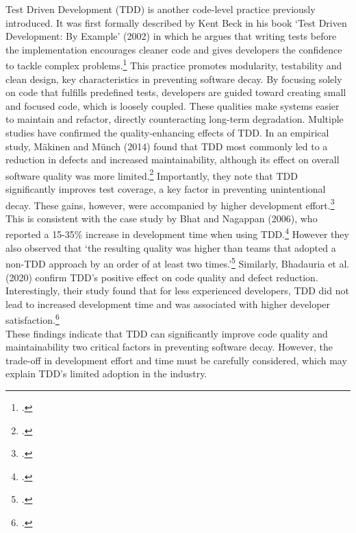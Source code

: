 Test Driven Development (TDD) is another code-level practice previously introduced. It was first formally described by Kent Beck in his book
`Test Driven Development: By Example' (2002) in which he argues that writing tests before the implementation
encourages cleaner code and gives developers the confidence to tackle complex problems.\footcite[pp. 8-9]{beckTestdrivenDevelopmentExample2002}
This practice promotes modularity, testability and clean design, key characteristics in preventing software decay. By focusing solely on code
that fulfills predefined tests, developers are guided toward creating small and focused code, which is loosely coupled. These qualities make systems
easier to maintain and refactor, directly counteracting long-term degradation.
Multiple studies have confirmed the quality-enhancing effects of \ac{TDD}.
In an empirical study, Mäkinen and Münch (2014) found that  TDD most commonly led to a reduction in defects and increased maintainability, 
although its effect on overall software quality was more limited.\footcite[13]{inproceedings}
Importantly, they note that TDD significantly improves test coverage, a key factor in preventing unintentional decay.
These gains, however, were accompanied by higher development effort.\footcite[13]{inproceedings}\\
This is consistent with the case study by Bhat and Nagappan (2006), who reported a 15-35\% increase in development time when using \ac{TDD}.\footcite[361]{bhatEvaluatingEfficacyTestdriven2006a}
However they also observed that `the resulting quality was higher than teams that adopted a non-TDD approach by an order of at least two times.'\footcite[361]{bhatEvaluatingEfficacyTestdriven2006a}
Similarly, Bhadauria et al. (2020) confirm TDD’s positive effect on code quality and defect reduction.
Interestingly, their study found that for less experienced developers, TDD did not lead to increased development time and was associated with higher developer satisfaction.\footcite[1058]{bhadauriaPerformanceOutcomesTestDriven2020}\\
These findings indicate that TDD can significantly improve code quality and maintainability two critical factors in preventing software decay.
However, the trade-off in development effort and time must be carefully considered, which may explain TDD's limited adoption in the industry.\\

